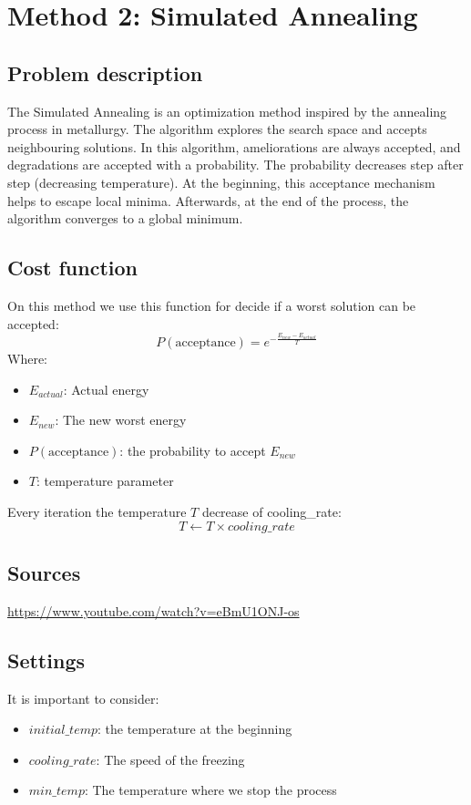 \section{Method 2: Simulated Annealing}

\subsection{Problem description}
The Simulated Annealing is an optimization method inspired by the annealing process in metallurgy. The algorithm explores the search space and accepts neighbouring solutions. In this algorithm, ameliorations are always accepted, and degradations are accepted with a probability. The probability decreases step after step (decreasing temperature). At the beginning, this acceptance mechanism helps to escape local minima. Afterwards, at the end of the process, the algorithm converges to a global minimum.

\subsection{Cost function}
On this method we use this function for decide if a worst solution can be accepted:
\begin{equation}
P(\text{acceptance}) = e^{-\frac{E_{new} - E _{actual}}{T}}
\end{equation}
Where:
\begin{itemize}
    \item $E _{actual}$: Actual energy
    \item $E_{new}$: The new worst energy
    \item $P(\text{acceptance})$: the probability to accept $E_{new}$
    \item $T$: temperature parameter
\end{itemize}

Every iteration the temperature $T$ decrease of cooling\_rate:
\begin{equation}
T \leftarrow T \times cooling\_rate
\end{equation}

\subsection{Sources}
\url{https://www.youtube.com/watch?v=eBmU1ONJ-os}

\subsection{Settings}
It is important to consider:
\begin{itemize}
    \item $initial\_temp$: the temperature at the beginning
    \item $cooling\_rate$: The speed of the freezing
    \item $min\_temp$: The temperature where we stop the process
\end{itemize}
